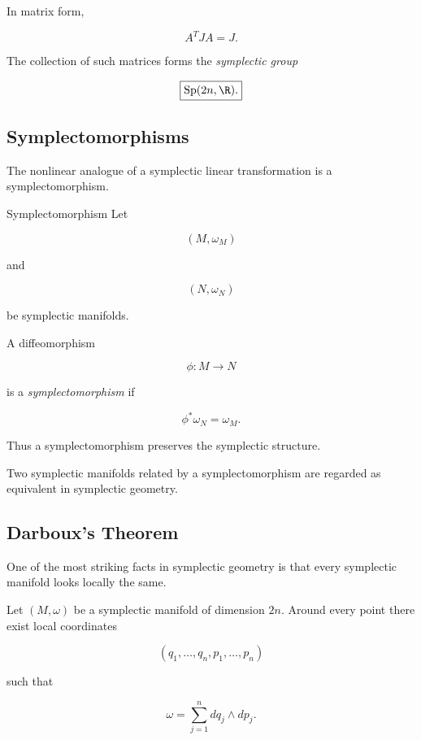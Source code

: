 In matrix form,

\[
\boxed{
A^TJA=J.
}
\]

The collection of such matrices forms the \emph{symplectic group}

\[
\boxed{
\operatorname{Sp}(2n,\R).
}
\]

\subsection{Symplectomorphisms}
\label{subsec:symplectomorphisms}

The nonlinear analogue of a symplectic linear transformation is a
symplectomorphism.

\begin{definitionbox}{Symplectomorphism}
Let

\[
(M,\omega_M)
\]

and

\[
(N,\omega_N)
\]

be symplectic manifolds.

A diffeomorphism

\[
\phi:M\to N
\]

is a \emph{symplectomorphism} if

\[
\boxed{
\phi^*\omega_N=\omega_M.
}
\]
\end{definitionbox}

Thus a symplectomorphism preserves the symplectic structure.

Two symplectic manifolds related by a symplectomorphism are regarded as
equivalent in symplectic geometry.

\subsection{Darboux's Theorem}
\label{subsec:darboux-theorem}

One of the most striking facts in symplectic geometry is that every
symplectic manifold looks locally the same.

\begin{theorem}
Let \((M,\omega)\) be a symplectic manifold of dimension \(2n\). Around every
point there exist local coordinates

\[
(q_1,\ldots,q_n,p_1,\ldots,p_n)
\]

such that

\[
\boxed{
\omega
=
\sum_{j=1}^{n}
dq_j\wedge dp_j.
}
\]
\end{theorem}

